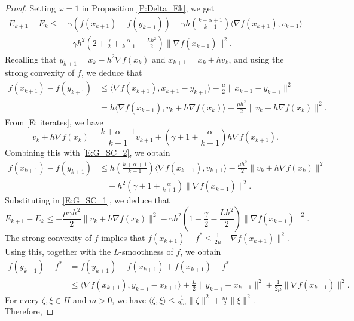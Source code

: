 \documentclass[onefignum,onetabnum]{siamart220329}
\begin{document}
\begin{proof}
Setting $\omega=1$ in Proposition \ref{P:Delta_Ek}, we get
\begin{align} \label{E:G_SC_1}
E_{k+1} - E_k 
\le & \   \gamma \left(f(x_{k+1}) - f(y_{k+1})  \right)   -\gamma h\left(\frac{k+\alpha+1}{k+1}\right) \langle \nabla f(x_{k+1}), v_{k+1} \rangle  \nonumber \\
&  -\gamma h^2 \left(2+\frac{\gamma}{2}+\frac{\alpha}{k+1}-\frac{L h^2}{2}\right)\| \nabla f(x_{k+1}) \|^2  .
\end{align}
Recalling that $y_{k+1}=x_k-h^2\nabla f(x_k)$ and $x_{k+1}=x_k+hv_k$, and using the strong convexity of $f$, we deduce that
\begin{align} \label{E:G_SC_2}
f(x_{k+1}) - f(y_{k+1}) & \le \langle \nabla f(x_{k+1}),x_{k+1}-y_{k+1}\rangle-\frac{\mu}{2}\|x_{k+1}-y_{k+1}\|^2  \nonumber \\
& = h\langle \nabla f(x_{k+1}), v_k + h\nabla f(x_k) \rangle - \frac{\mu h^2}{2}\| v_k + h\nabla f(x_k) \|^2.
\end{align}
From \eqref{E: iterates}, we have
$$ v_k + h \nabla f(x_k) = \frac{k+\alpha+1}{k+1} v_{k+1} + \left( \gamma + 1 + \frac{\alpha}{k+1} \right) h\nabla f(x_{k+1}).$$
Combining this with \eqref{E:G_SC_2}, we obtain
\begin{align*} %
f(x_{k+1}) - f(y_{k+1})  
&\le  h\left(\frac{k+\alpha+1}{k+1}\right)\langle \nabla f(x_{k+1}), v_{k+1} \rangle - \frac{\mu h^2}{2}\| v_k + h\nabla f(x_k) \|^2\nonumber \\
&\quad +h^2\left( \gamma + 1 + \frac{\alpha}{k+1} \right)\|\nabla f(x_{k+1})\|^2 .
\end{align*}
Substituting in \eqref{E:G_SC_1}, we deduce that
\begin{equation} \label{E:G_SC_4}
E_{k+1} - E_k \le   - \frac{\mu\gamma h^2}{2}\| v_k + h\nabla f(x_k) \|^2   -\gamma h^2 \left(1-\frac{\gamma}{2}-\frac{L h^2}{2}\right)\| \nabla f(x_{k+1}) \|^2.
\end{equation}
The strong convexity of $f$ implies that $f(x_{k+1}) - f^* \le \frac{1}{2\mu}\| \nabla f(x_{k+1}) \|^2$. Using this, together with the $L$-smoothness of $f$, we obtain
\begin{align*}
f(y_{k+1}) - f^*
&= f(y_{k+1}) - f(x_{k+1}) + f(x_{k+1}) - f^* \\
&\le \langle \nabla f(x_{k+1}), y_{k+1} - x_{k+1} \rangle + \frac{L}{2}\| y_{k+1} - x_{k+1} \|^2 + \frac{1}{2\mu}\| \nabla f(x_{k+1}) \|^2.
\end{align*}
For every $\zeta,\xi\in H$ and $m >0$, we have $\langle \zeta,\xi\rangle \le \frac{1}{2m}\| \zeta \|^2 + \frac{m}{2}\|\xi \|^2$. Therefore, 

\end{proof}
\end{document}
